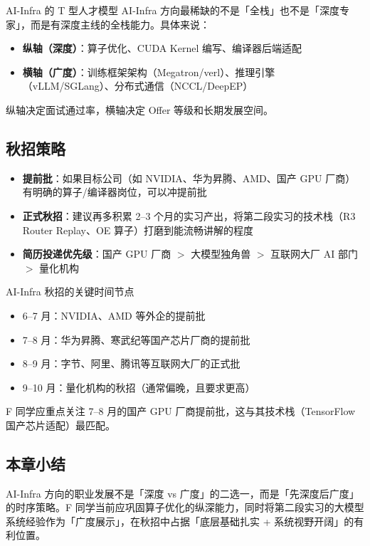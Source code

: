 \documentclass[a4paper]{article}
\begin{document}
\begin{importantbox}{AI-Infra 的 T 型人才模型}
AI-Infra 方向最稀缺的不是「全栈」也不是「深度专家」，而是有深度主线的全栈能力。具体来说：
\begin{itemize}
    \item \textbf{纵轴（深度）}：算子优化、CUDA Kernel 编写、编译器后端适配
    \item \textbf{横轴（广度）}：训练框架架构（Megatron/verl）、推理引擎（vLLM/SGLang）、分布式通信（NCCL/DeepEP）
\end{itemize}
纵轴决定面试通过率，横轴决定 Offer 等级和长期发展空间。
\end{importantbox}

\subsection{秋招策略}

\begin{itemize}
    \item \textbf{提前批}：如果目标公司（如 NVIDIA、华为昇腾、AMD、国产 GPU 厂商）有明确的算子/编译器岗位，可以冲提前批
    \item \textbf{正式秋招}：建议再多积累 2--3 个月的实习产出，将第二段实习的技术栈（R3 Router Replay、OE 算子）打磨到能流畅讲解的程度
    \item \textbf{简历投递优先级}：国产 GPU 厂商 $>$ 大模型独角兽 $>$ 互联网大厂 AI 部门 $>$ 量化机构
\end{itemize}

\begin{warningbox}{AI-Infra 秋招的关键时间节点}
\begin{itemize}
    \item 6--7 月：NVIDIA、AMD 等外企的提前批
    \item 7--8 月：华为昇腾、寒武纪等国产芯片厂商的提前批
    \item 8--9 月：字节、阿里、腾讯等互联网大厂的正式批
    \item 9--10 月：量化机构的秋招（通常偏晚，且要求更高）
\end{itemize}
F 同学应重点关注 7--8 月的国产 GPU 厂商提前批，这与其技术栈（TensorFlow 国产芯片适配）最匹配。
\end{warningbox}

\subsection{本章小结}
AI-Infra 方向的职业发展不是「深度 vs 广度」的二选一，而是「先深度后广度」的时序策略。F 同学当前应巩固算子优化的纵深能力，同时将第二段实习的大模型系统经验作为「广度展示」，在秋招中占据「底层基础扎实 + 系统视野开阔」的有利位置。
\end{document}
